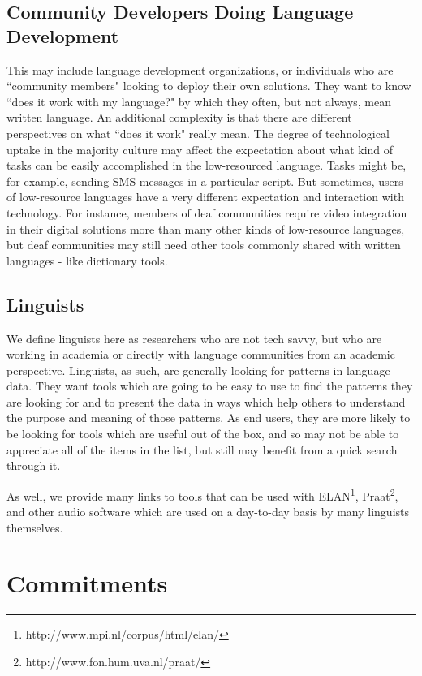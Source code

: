 \documentclass[10pt, a4paper]{article}
\begin{document}
\subsection{Community Developers Doing Language Development}

This may include language development organizations, or individuals who are ``community members" looking to deploy their own solutions. They want to know ``does it work with my language?" by which they often, but not always, mean written language. An additional complexity is that there are different perspectives on what ``does it work" really mean. The degree of technological uptake in the majority culture may affect the expectation about what kind of tasks can be easily accomplished in the low-resourced language. Tasks might be, for example, sending SMS messages in a particular script. But sometimes, users of low-resource languages have a very different expectation and interaction with technology. For instance, members of deaf communities require video integration in their digital solutions more than many other kinds of low-resource languages, but deaf communities may still need other tools commonly shared with written languages - like dictionary tools.

\subsection{Linguists}

We define linguists here as researchers who are not tech savvy, but who are working in academia or directly with language communities from an academic perspective. Linguists, as such, are generally looking for patterns in language data. They want tools which are going to be easy to use to find the patterns they are looking for and to present the data in ways which help others to understand the purpose and meaning of those patterns. As end users, they are more likely to be looking for tools which are useful out of the box, and so may not be able to appreciate all of the items in the list, but still may benefit from a quick search through it. 

As well, we provide many links to tools that can be used with ELAN\footnote{http://www.mpi.nl/corpus/html/elan/}, Praat\footnote{http://www.fon.hum.uva.nl/praat/}, and other audio software which are used on a day-to-day basis by many linguists themselves. 

\section{Commitments}
\end{document}
